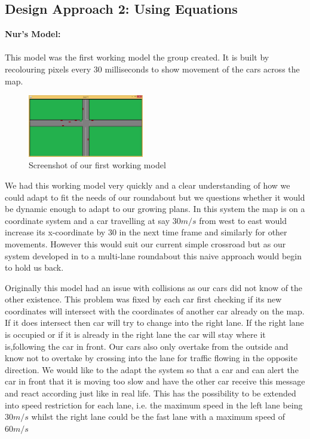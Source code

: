 \documentclass[11pt]{article}
\begin{document}
\subsection{Design Approach 2: Using Equations}

{\bf Nur's Model:}\\\\
This model was the first working model the group created. It is built by recolouring pixels every 30 milliseconds to show movement of the cars across the map. 

%
%
\FloatBarrier
\begin{figure}[h]
	\centering
	\includegraphics[width=0.45\textwidth]{ScreenShotNurSim}
	\caption{Screenshot of our first working model}
	
\end{figure}

We had this working model very quickly and a clear understanding of how we could adapt to fit the needs of our roundabout but we questions whether it would be dynamic enough to adapt to our growing plans. In this system the map is on a coordinate system and a car travelling at say $30 m/s$ from west to east would increase its x-coordinate by 30 in the next time frame and similarly for other movements. However this would suit our current simple crossroad but as our system developed in to a multi-lane roundabout this naive approach would begin to hold us back.

Originally this model had an issue with collisions as our cars did not know of the other existence. This problem was fixed by each car first checking if its new coordinates will intersect with the coordinates of another car already on the map. If it does intersect then car will try to change into the right lane. If the right lane is occupied or if it is already in the right lane the car will stay where it is,following the car in front. Our cars also only overtake from the outside and know not to overtake by crossing into the lane for traffic flowing in the opposite direction. We would like to the adapt the system so that a car and can alert the car in front that it is moving too slow and have the other car receive this message and react according just like in real life. This has the possibility to be extended into speed restriction for each lane, i.e. the maximum speed in the left lane being $30m/s$ whilst the right lane could be the fast lane with a maximum speed of $60m/s$\\
\end{document}
